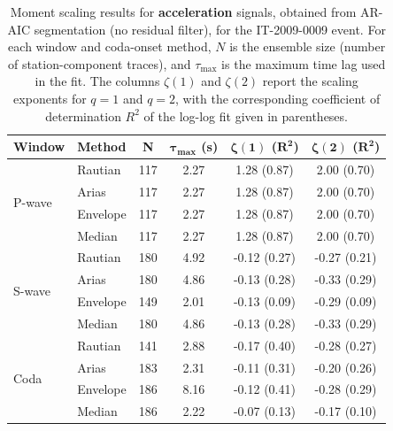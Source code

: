 \begin{table}[H]
\centering
\small
\begin{tabular}{llcccc}
\toprule
\textbf{Window} & \textbf{Method} & \textbf{N} & $\bm{\tau_{\max}}$ \textbf{(s)} & $\bm{\zeta(1)}$ \textbf{(}$\bm{R^2}$\textbf{)} & $\bm{\zeta(2)}$ \textbf{(}$\bm{R^2}$\textbf{)} \\
\midrule
\multirow{4}{*}{P-wave}
& Rautian & 117 & 2.27 & 1.28 (0.87) & 2.00 (0.70) \\
& Arias & 117 & 2.27 & 1.28 (0.87) & 2.00 (0.70) \\
& Envelope & 117 & 2.27 & 1.28 (0.87) & 2.00 (0.70) \\
& Median & 117 & 2.27 & 1.28 (0.87) & 2.00 (0.70) \\
\midrule
\multirow{4}{*}{S-wave}
& Rautian & 180 & 4.92 & -0.12 (0.27) & -0.27 (0.21) \\
& Arias & 180 & 4.86 & -0.13 (0.28) & -0.33 (0.29) \\
& Envelope & 149 & 2.01 & -0.13 (0.09) & -0.29 (0.09) \\
& Median & 180 & 4.86 & -0.13 (0.28) & -0.33 (0.29) \\
\midrule
\multirow{4}{*}{Coda}
& Rautian & 141 & 2.88 & -0.17 (0.40) & -0.28 (0.27) \\
& Arias & 183 & 2.31 & -0.11 (0.31) & -0.20 (0.26) \\
& Envelope & 186 & 8.16 & -0.12 (0.41) & -0.28 (0.29) \\
& Median & 186 & 2.22 & -0.07 (0.13) & -0.17 (0.10) \\
\bottomrule
\end{tabular}
\caption{Moment scaling results for \textbf{acceleration} signals, obtained from AR-AIC segmentation (no residual filter), for the IT-2009-0009 event. For each window and coda-onset method, $N$ is the ensemble size (number of station-component traces), and $\tau_{\max}$ is the maximum time lag used in the fit. The columns $\zeta(1)$ and $\zeta(2)$ report the scaling exponents for $q=1$ and $q=2$, with the corresponding coefficient of determination $R^2$ of the log-log fit given in parentheses.}
\label{tab:ar_aic_scaling_acc_nothresh_laquila}
\end{table}